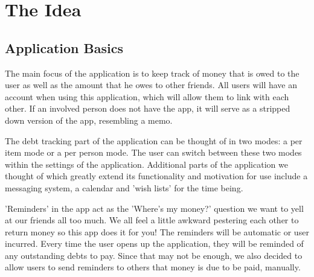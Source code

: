 \documentclass[a4paper,11pt]{article}
\begin{document}
\section*{The Idea}

\subsection*{Application Basics}
The main focus of the application is to keep track of money that is owed to the user as well as the amount that he owes to other friends. All users will have an account when using this application, which will allow them to link with each other. If an involved person does not have the app, it will serve as a stripped down version of the app, resembling a memo.

The debt tracking part of the application can be thought of in two modes: a per item mode or a per person mode. The user can switch between these two modes within the settings of the application.  
Additional parts of the application we thought of which greatly extend its functionality and motivation for use include a messaging system, a calendar and 'wish lists' for the time being. 

'Reminders' in the app act as the 'Where's my money?' question we want to yell at our friends all too much. We all feel a little awkward pestering each other to return money so this app does it for you!
The reminders will be automatic or user incurred. Every time the user opens up the application, they will be reminded of any outstanding debts to pay. Since that may not be enough, we also decided to allow users to send reminders to others that money is due to be paid, manually. 
\end{document}

